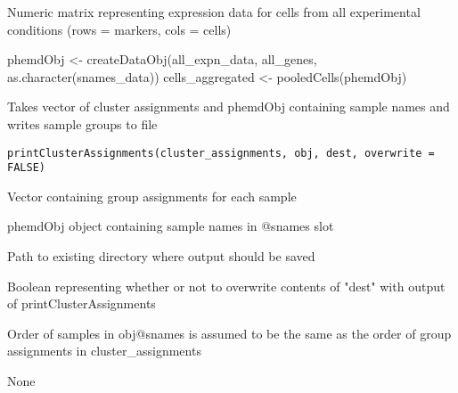 \documentclass[a4paper]{book}
\begin{document}
%
\begin{Value}
Numeric matrix representing expression data for cells from all experimental conditions (rows = markers, cols = cells)
\end{Value}
%
\begin{Examples}
\begin{ExampleCode}
phemdObj <- createDataObj(all_expn_data, all_genes, as.character(snames_data))
cells_aggregated <- pooledCells(phemdObj)

\end{ExampleCode}
\end{Examples}
%
\begin{Description}\relax
Takes vector of cluster assignments and phemdObj containing sample names and writes sample groups to file
\end{Description}
%
\begin{Usage}
\begin{verbatim}
printClusterAssignments(cluster_assignments, obj, dest, overwrite = FALSE)
\end{verbatim}
\end{Usage}
%
\begin{Arguments}
\begin{ldescription}
\item[\code{cluster\_assignments}] Vector containing group assignments for each sample

\item[\code{obj}] phemdObj object containing sample names in @snames slot

\item[\code{dest}] Path to existing directory where output should be saved

\item[\code{overwrite}] Boolean representing whether or not to overwrite contents of "dest" with output of printClusterAssignments
\end{ldescription}
\end{Arguments}
%
\begin{Details}\relax
Order of samples in obj@snames is assumed to be the same as the order of group assignments in cluster\_assignments
\end{Details}
%
\begin{Value}
None
\end{Value}
%
\end{document}
